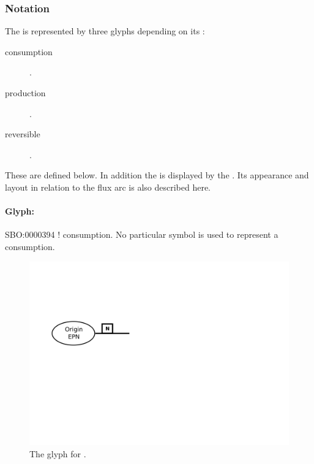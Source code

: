 \subsubsection{Notation}

The  is represented by three glyphs depending on
its :

\begin{description}
\item[consumption] .
\item[production] .
\item[reversible] .
\end{description}

These are defined below. In addition the  is
displayed by the . Its appearance and
layout in relation to the flux arc is also described here.

\paragraph{Glyph: }
\label{sec:techref:consumption}

\begin{glyphDescription}
 \glyphSboTerm SBO:0000394 ! consumption.
 \glyphEndPoint No particular symbol is used to represent a consumption.
\end{glyphDescription}


\begin{figure}[htb]
  \centering
  \includegraphics[scale = 0.4]{images/consumption}
  \caption{The \PD glyph for .}
  \label{fig:techref:consumption}
\end{figure}


